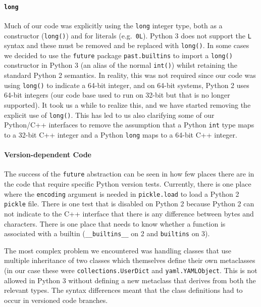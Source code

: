 \documentclass[11pt,twoside]{article}
\begin{document}
\paragraph{\texttt{long}}

Much of our code was explicitly using the \texttt{long} integer type, both as a constructor (\texttt{long()}) and for literals (e.g.\ \texttt{0L}).
Python 3 does not support the \texttt{L} syntax and these must be removed and be replaced with \texttt{long()}.
In some cases we decided to use the \texttt{future} package \texttt{past.builtins} to import a \texttt{long()} constructor in Python 3 (an alias of the normal \texttt{int()}) whilst retaining the standard Python 2 semantics.
In reality, this was not required since our code was using \texttt{long()} to indicate a 64-bit integer, and on 64-bit systems, Python 2 uses 64-bit integers (our code base used to run on 32-bit but that is no longer supported).
It took us a while to realize this, and we have started removing the explicit use of \texttt{long()}.
This has led to us also clarifying some of our Python/C++ interfaces to remove the assumption that a Python \texttt{int} type maps to a 32-bit C++ integer and a Python \texttt{long} maps to a 64-bit C++ integer.

\paragraph{Version-dependent Code}

The success of the \texttt{future} abstraction can be seen in how few places there are in the code that require specific Python version tests.
Currently, there is one place where the \texttt{encoding} argument is needed in \texttt{pickle.load} to load a Python 2 \texttt{pickle} file.
There is one test that is disabled on Python 2 because Python 2 can not indicate to the C++ interface that there is any difference between bytes and characters.
There is one place that needs to know whether a function is associated with a builtin (\texttt{\_\_builtins\_\_} on 2 and \texttt{builtins} on 3).

The most complex problem we encountered was handling classes that use multiple inheritance of two classes which themselves define their own metaclasses (in our case these were \texttt{collections.UserDict} and \texttt{yaml.YAMLObject}.
This is not allowed in Python 3 without defining a new metaclass that derives from both the relevant types.
The syntax differences meant that the class definitions had to occur in versioned code branches.
\end{document}
